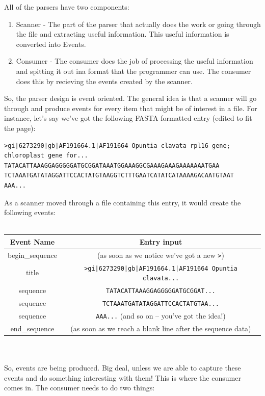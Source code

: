 \documentclass{article}
\begin{document}
All of the parsers have two components:

\begin{enumerate}

\item Scanner - The part of the parser that actually does the work or going through the file and extracting useful information. This useful information is converted into Events.

\item Consumer - The consumer does the job of processing the useful information and spitting it out ina format that the programmer can use. The consumer does this by recieving the events created by the scanner.

\end{enumerate}

So, the parser design is event oriented. The general idea is that a scanner will go through and produce events for every item that might be of interest in a file. For instance, let's say we've got the following FASTA formatted entry (edited to fit the page):


\begin{verbatim}
>gi|6273290|gb|AF191664.1|AF191664 Opuntia clavata rpl16 gene; chloroplast gene for...
TATACATTAAAGGAGGGGGATGCGGATAAATGGAAAGGCGAAAGAAAGAAAAAAATGAA
TCTAAATGATATAGGATTCCACTATGTAAGGTCTTTGAATCATATCATAAAAGACAATGTAAT
AAA...
\end{verbatim}

As a scanner moved through a file containing this entry, it would create the following events:
\\
\\
\begin{tabular}{cc}
Event Name & Entry input \\
\hline
begin\_sequence & (as soon as we notice we've got a new \verb|>|) \\
title & \verb+>gi|6273290|gb|AF191664.1|AF191664 Opuntia clavata...+ \\
sequence & \verb|TATACATTAAAGGAGGGGGATGCGGAT...| \\
sequence & \verb|TCTAAATGATATAGGATTCCACTATGTAA...| \\
sequence & \verb|AAA...| (and so on -- you've got the idea!) \\
end\_sequence & (as soon as we reach a blank line after the sequence data) \\

\end{tabular}
\\
\\
So, events are being produced. Big deal, unless we are able to capture these events and do something interesting with them! This is where the consumer comes in. The consumer needs to do two things:
\end{document}
